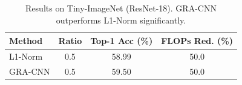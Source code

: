 \begin{table}[ht]
\centering
\caption{Results on Tiny-ImageNet (ResNet-18). GRA-CNN outperforms L1-Norm significantly.}
\label{tab:tiny_results}
\begin{tabular}{lccc}
\toprule
Method & Ratio & Top-1 Acc (\%) & FLOPs Red. (\%) \\
\midrule
L1-Norm & 0.5 & 58.99 & 50.0 \\
GRA-CNN & 0.5 & 59.50 & 50.0 \\
\bottomrule
\end{tabular}
\end{table}